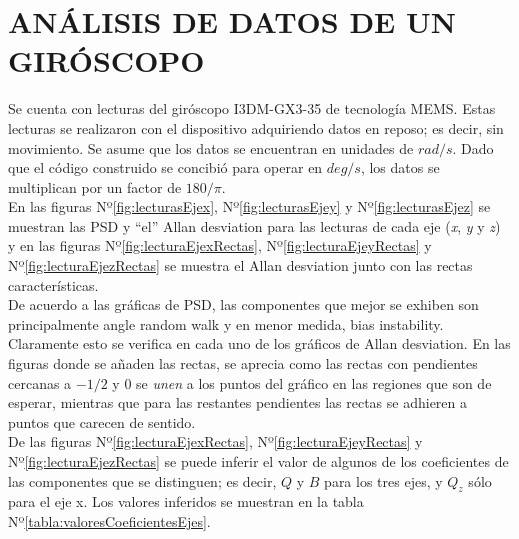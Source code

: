 \documentclass[a4paper,11pt,twoside]{IT-CNEA}
\begin{document}
\section{ANÁLISIS DE DATOS DE UN GIRÓSCOPO}
Se cuenta con lecturas del giróscopo I3DM-GX3-35 de tecnología MEMS. Estas lecturas se realizaron con el dispositivo adquiriendo datos en reposo; es decir, sin movimiento. Se asume que los datos se encuentran en unidades de $rad/s$. Dado que el código construido se concibió para operar en $deg/s$, los datos se multiplican por un factor de $180/\pi$.
\\En las figuras Nº\ref{fig:lecturasEjex}, Nº\ref{fig:lecturasEjey} y Nº\ref{fig:lecturasEjez} se muestran las PSD y ``el'' Allan desviation para las lecturas de cada eje (\textit{x}, \textit{y} y \textit{z}) y en las figuras Nº\ref{fig:lecturaEjexRectas}, Nº\ref{fig:lecturaEjeyRectas} y Nº\ref{fig:lecturaEjezRectas} se muestra el Allan desviation junto con las rectas características. 
\\ De acuerdo a las gráficas de PSD, las componentes que mejor se exhiben son principalmente angle random walk y en menor medida, bias instability. Claramente esto se verifica en cada uno de los gráficos de Allan desviation. En las figuras donde se añaden las rectas, se aprecia como las rectas con pendientes cercanas a $-1/2$ y $0$ se \textit{unen} a los puntos del gráfico en las regiones que son de esperar, mientras que para las restantes pendientes las rectas se adhieren a puntos que carecen de sentido. 
\\ De las figuras Nº\ref{fig:lecturaEjexRectas}, Nº\ref{fig:lecturaEjeyRectas} y Nº\ref{fig:lecturaEjezRectas} se puede inferir el valor de algunos de los coeficientes de las componentes que se distinguen; es decir, $Q$ y $B$ para los tres ejes, y $Q_z$ sólo para el eje x. Los valores inferidos se muestran en la tabla Nº\ref{tabla:valoresCoeficientesEjes}.
\end{document}
